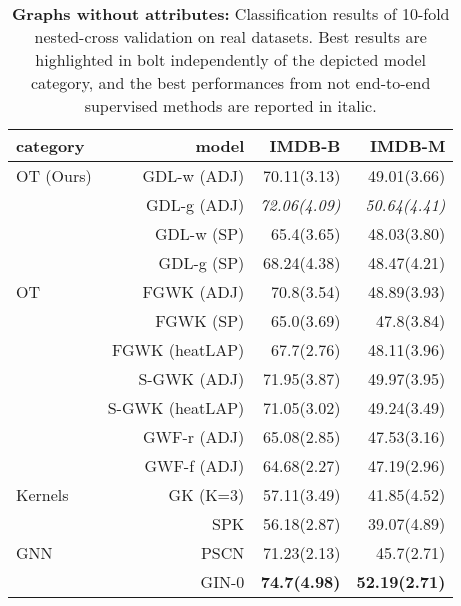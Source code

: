 \documentclass{article}
\begin{document}
	\begin{table}[!h]
		\caption{\textbf{Graphs without attributes:} Classification results of 10-fold nested-cross validation on real datasets. Best results are highlighted in bolt independently of the depicted model category, and the best performances from not end-to-end supervised methods are reported in italic. }
		\label{tab:res1}
		\begin{center}
			\scalebox{0.81}
			{\begin{tabular}{|l|r|r|r|}
					\hline
					category & model & IMDB-B & IMDB-M \\ \hline
					OT (Ours) & GDL-w (ADJ) &70.11(3.13)& 49.01(3.66) \\ 
					& GDL-g (ADJ) & \textit{72.06(4.09)} & \textit{50.64(4.41)} \\
					& GDL-w (SP) & 65.4(3.65) & 48.03(3.80) \\
					& GDL-g (SP) & 68.24(4.38) & 48.47(4.21) \\ \hline 			
					OT & FGWK (ADJ) & 70.8(3.54) &  48.89(3.93)\\  
					& FGWK (SP) & 65.0(3.69)& 47.8(3.84)\\
					& FGWK (heatLAP) & 67.7(2.76)& 48.11(3.96) \\
					& S-GWK (ADJ) & 71.95(3.87) & 49.97(3.95)\\
					& S-GWK (heatLAP) & 71.05(3.02) & 49.24(3.49)\\
					& GWF-r (ADJ) & 65.08(2.85) & 47.53(3.16)\\
					& GWF-f (ADJ) & 64.68(2.27) & 47.19(2.96) \\ \hline
					Kernels & GK (K=3) & 57.11(3.49) & 41.85(4.52) \\
					& SPK & 56.18(2.87) & 39.07(4.89) \\ \hline
					
					GNN & PSCN & 71.23(2.13)& 45.7(2.71)\\
					& GIN-0 & \textbf{74.7(4.98)}& \textbf{52.19(2.71)}\\ \hline
			\end{tabular}}
		\end{center}
	\end{table}
	\vspace{-5mm}
\end{document}
